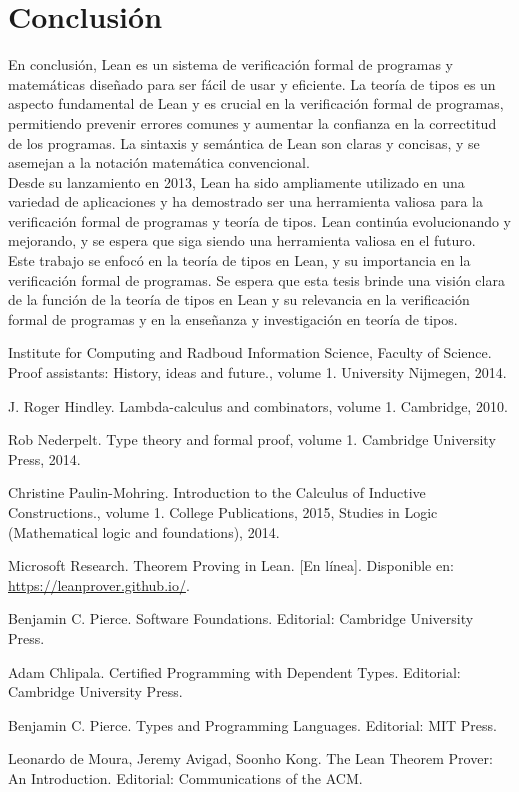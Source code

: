 \documentclass{article}
\begin{document}
\section{Conclusión}
En conclusión, Lean es un sistema de verificación formal de programas y
matemáticas diseñado para ser fácil de usar y eficiente. La teoría de
tipos es un aspecto fundamental de Lean y es crucial en la verificación
formal de programas, permitiendo prevenir errores comunes y aumentar la
confianza en la correctitud de los programas. La sintaxis y semántica de
Lean son claras y concisas, y se asemejan a la notación matemática
convencional.\\

Desde su lanzamiento en 2013, Lean ha sido ampliamente utilizado en una
variedad de aplicaciones y ha demostrado ser una herramienta valiosa para
la verificación formal de programas y teoría de tipos. Lean continúa
evolucionando y mejorando, y se espera que siga siendo una herramienta
valiosa en el futuro.\\

Este trabajo se enfocó en la teoría de tipos en Lean, y su importancia en
la verificación formal de programas. Se espera que esta tesis brinde una
visión clara de la función de la teoría de tipos en Lean y su relevancia
en la verificación formal de programas y en la enseñanza y investigación
en teoría de tipos.
\begin{thebibliography}{9}

	 Institute for Computing and Radboud Information Science, Faculty of Science.
	Proof assistants: History, ideas and future., volume 1. University Nijmegen, 2014.

	 J. Roger Hindley. Lambda-calculus and combinators, volume 1. Cambridge, 2010.

	 Rob  Nederpelt. Type theory and formal proof, volume 1. Cambridge University
	Press, 2014.

	 Christine Paulin-Mohring. Introduction to the Calculus of Inductive Constructions., volume 1. College Publications, 2015, Studies in Logic (Mathematical
	logic and foundations), 2014.

	Microsoft Research.
	Theorem Proving in Lean.
		[En línea]. Disponible en: \url{https://leanprover.github.io/}.

	Benjamin C. Pierce.
	Software Foundations.
	Editorial: Cambridge University Press.

	Adam Chlipala.
	Certified Programming with Dependent Types.
	Editorial: Cambridge University Press.

	Benjamin C. Pierce.
	Types and Programming Languages.
	Editorial: MIT Press.

	Leonardo de Moura, Jeremy Avigad, Soonho Kong.
	The Lean Theorem Prover: An Introduction.
	Editorial: Communications of the ACM.

\end{thebibliography}
\end{document}
